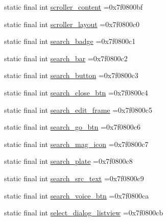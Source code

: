 \begin{DoxyCompactItemize}
\item 
static final int \mbox{\hyperlink{classcom_1_1example_1_1trainawearapplication_1_1_r_1_1id_a56fd0e5f169974aa483922048106021f}{scroller\+\_\+content}} =0x7f0800bf
\item 
static final int \mbox{\hyperlink{classcom_1_1example_1_1trainawearapplication_1_1_r_1_1id_aaa84fe81f30b261d0249aed2fea9cdf1}{scroller\+\_\+layout}} =0x7f0800c0
\item 
static final int \mbox{\hyperlink{classcom_1_1example_1_1trainawearapplication_1_1_r_1_1id_aa1947f43d506818478a431b1e4fad074}{search\+\_\+badge}} =0x7f0800c1
\item 
static final int \mbox{\hyperlink{classcom_1_1example_1_1trainawearapplication_1_1_r_1_1id_a39179c07c9b805c967e006e9306344a3}{search\+\_\+bar}} =0x7f0800c2
\item 
static final int \mbox{\hyperlink{classcom_1_1example_1_1trainawearapplication_1_1_r_1_1id_ad8689c3cc298b28cd941a439bcdfaa42}{search\+\_\+button}} =0x7f0800c3
\item 
static final int \mbox{\hyperlink{classcom_1_1example_1_1trainawearapplication_1_1_r_1_1id_a6eb271b4b2d6255c0e959e40aa30846c}{search\+\_\+close\+\_\+btn}} =0x7f0800c4
\item 
static final int \mbox{\hyperlink{classcom_1_1example_1_1trainawearapplication_1_1_r_1_1id_ac234459e477eea714e6b73fd41b4e97f}{search\+\_\+edit\+\_\+frame}} =0x7f0800c5
\item 
static final int \mbox{\hyperlink{classcom_1_1example_1_1trainawearapplication_1_1_r_1_1id_a5f7e52a6f1bbe1507236e7de918b95d7}{search\+\_\+go\+\_\+btn}} =0x7f0800c6
\item 
static final int \mbox{\hyperlink{classcom_1_1example_1_1trainawearapplication_1_1_r_1_1id_a96f0b968579d1c2fbe58b090a56b55ba}{search\+\_\+mag\+\_\+icon}} =0x7f0800c7
\item 
static final int \mbox{\hyperlink{classcom_1_1example_1_1trainawearapplication_1_1_r_1_1id_a0868ccd91f930e5925e3576315ac200b}{search\+\_\+plate}} =0x7f0800c8
\item 
static final int \mbox{\hyperlink{classcom_1_1example_1_1trainawearapplication_1_1_r_1_1id_a90cde268e3606257aeadccf7a4448cd7}{search\+\_\+src\+\_\+text}} =0x7f0800c9
\item 
static final int \mbox{\hyperlink{classcom_1_1example_1_1trainawearapplication_1_1_r_1_1id_affdd1202b31da0d06aaed026394ea2e2}{search\+\_\+voice\+\_\+btn}} =0x7f0800ca
\item 
static final int \mbox{\hyperlink{classcom_1_1example_1_1trainawearapplication_1_1_r_1_1id_acc16e7da157086729da95d162698fe1c}{select\+\_\+dialog\+\_\+listview}} =0x7f0800cb

\end{DoxyCompactItemize}
